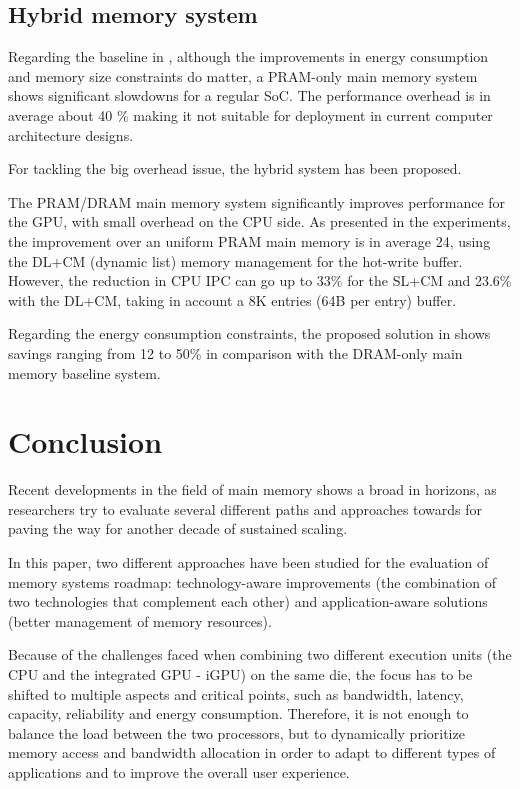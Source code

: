 \documentclass[12pt,journal,compsoc]{IEEEtran}
\begin{document}
\subsection{Hybrid memory system}
Regarding the baseline in \cite{PRAM}, although the improvements in energy consumption and memory size constraints do matter, a PRAM-only main memory system shows significant slowdowns for a regular SoC. The performance overhead is in average about 40 \% making it not suitable for deployment in current computer architecture designs. 

For tackling the big overhead issue, the hybrid system has been proposed. 

The PRAM/DRAM main memory system significantly improves performance for the GPU, with small overhead on the CPU side. As presented in the experiments, the improvement over an uniform PRAM main memory is in average 24, using the DL+CM (dynamic list) memory management for the hot-write buffer. However, the reduction in CPU IPC can go up to 33\% for the SL+CM and 23.6\% with the DL+CM, taking in account a 8K entries (64B per entry) buffer\cite{PRAM}. 

Regarding the energy consumption constraints, the proposed solution in \cite{PDRAM} shows savings ranging from 12 to 50\% in comparison with the DRAM-only main memory baseline system.

\section{Conclusion}
Recent developments in the field of main memory shows a broad in horizons, as researchers try to evaluate several different paths and approaches towards for paving the way for another decade of sustained scaling. 

In this paper, two different approaches have been studied for the evaluation of memory systems roadmap: technology-aware improvements (the combination of two technologies that complement each other)  and application-aware solutions (better management of memory resources). 

Because of the challenges faced when combining two different execution units (the CPU and the integrated GPU - iGPU) on the same die, the focus has to be shifted to multiple aspects and critical points, such as bandwidth, latency, capacity, reliability and energy consumption. Therefore, it is not enough to balance the load between the two processors, but to dynamically prioritize memory access \cite{LLC} and bandwidth allocation in order to adapt to different types of applications and to improve the overall user experience. 
\end{document}
